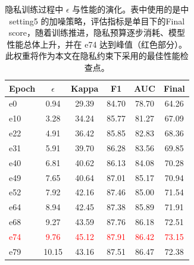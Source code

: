 \begin{table}[!htb]
\centering
\caption{隐私训练过程中 $\epsilon$ 与性能的演化。表中使用的是中 setting5 的加噪策略，评估指标是单目下的Final score，随着训练推进，隐私预算逐步消耗、模型性能总体上升，并在 e74 达到峰值（红色部分）。此权重将作为本文在隐私约束下采用的最佳性能检查点。}
\label{tab:privacy-evolution}
\begin{tabular}{lccccc}
\toprule
Epoch & $\epsilon$ & Kappa & F1 & AUC & Final \\
\midrule
e0 & 0.94 & 29.39 & 84.70 & 78.70 & 64.26 \\
e10 & 3.28 & 34.24 & 85.77 & 81.27 & 67.09 \\
e22 & 4.91 & 36.42 & 85.85 & 82.83 & 68.36 \\
e31 & 5.91 & 39.70 & 86.28 & 83.56 & 69.85 \\
e40 & 6.81 & 40.62 & 86.13 & 84.08 & 70.28 \\
e49 & 7.65 & 40.64 & 87.01 & 85.17 & 70.94 \\
e52 & 7.92 & 42.16 & 87.46 & 85.00 & 71.54 \\
e64 & 8.94 & 42.45 & 87.38 & 85.89 & 71.91 \\
e68 & 9.27 & 43.59 & 87.76 & 86.18 & 72.51 \\
\textcolor{red}{e74} & \textcolor{red}{9.76} & \textcolor{red}{45.12} & \textcolor{red}{87.91} & \textcolor{red}{86.42} & \textcolor{red}{73.15} \\
e79 & 10.15 & 43.16 & 87.51 & 86.47 & 72.38 \\
\bottomrule
\end{tabular}
\end{table}
